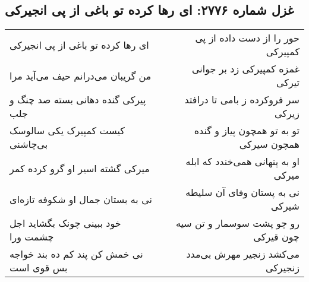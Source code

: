 \begin{center}
\section*{غزل شماره ۲۷۷۶: ای رها کرده تو باغی از پی انجیرکی}
\label{sec:2776}
\begin{longtable}{l p{0.5cm} r}
ای رها کرده تو باغی از پی انجیرکی
&&
حور را از دست داده از پی کمپیرکی
\\
من گریبان می‌درانم حیف می‌آید مرا
&&
غمزه کمپیرکی زد بر جوانی تیرکی
\\
پیرکی گنده دهانی بسته صد چنگ و جلب
&&
سر فروکرده ز بامی تا درافتد زیرکی
\\
کیست کمپیرک یکی سالوسک بی‌چاشنی
&&
تو به تو همچون پیاز و گنده همچون سیرکی
\\
میرکی گشته اسیر او گرو کرده کمر
&&
او به پنهانی همی‌خندد که ابله میرکی
\\
نی به بستان جمال او شکوفه تازه‌ای
&&
نی به پستان وفای آن سلیطه شیرکی
\\
خود ببینی چونک بگشاید اجل چشمت ورا
&&
رو چو پشت سوسمار و تن سیه چون قیرکی
\\
نی خمش کن پند کم ده بند خواجه بس قوی است
&&
می‌کشد زنجیر مهرش بی‌مدد زنجیرکی
\\
\end{longtable}
\end{center}
